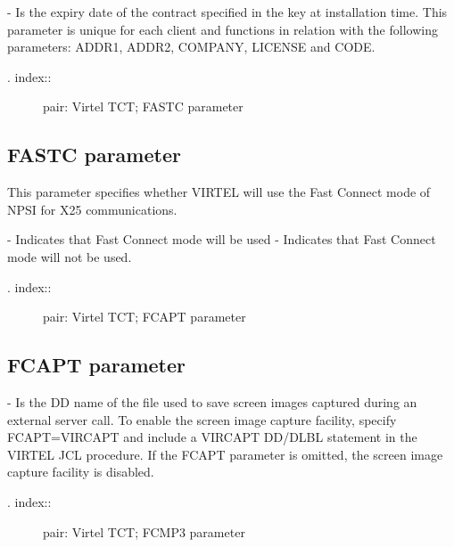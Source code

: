 \documentclass[letterpaper,10pt,english]{sphinxmanual}
\begin{document}
 - Is the expiry date of the contract specified in the key at installation time. This parameter is unique for each client and functions in relation with the following parameters: ADDR1, ADDR2, COMPANY, LICENSE and CODE.
\begin{description}
\item[{. index::}] \leavevmode
pair: Virtel TCT; FASTC parameter

\end{description}


\subsection{FASTC parameter}
\label{\detokenize{Installation_Guide:fastc-parameter}}
\begin{sphinxVerbatim}[commandchars=\\\{\}]
 
\end{sphinxVerbatim}

This parameter specifies whether VIRTEL will use the Fast Connect mode of NPSI for X25 communications.

 - Indicates that Fast Connect mode will be used
 - Indicates that Fast Connect mode will not be used.
\begin{description}
\item[{. index::}] \leavevmode
pair: Virtel TCT; FCAPT parameter

\end{description}


\subsection{FCAPT parameter}
\label{\detokenize{Installation_Guide:fcapt-parameter}}
\begin{sphinxVerbatim}[commandchars=\\\{\}]
  
\end{sphinxVerbatim}

 - Is the DD name of the file used to save screen images captured during an external server call. To enable the screen image capture facility, specify FCAPT=VIRCAPT and include a VIRCAPT DD/DLBL statement in the VIRTEL JCL procedure. If the FCAPT parameter is omitted, the screen image capture facility is disabled.
\begin{description}
\item[{. index::}] \leavevmode
pair: Virtel TCT; FCMP3 parameter

\end{description}
\end{document}
